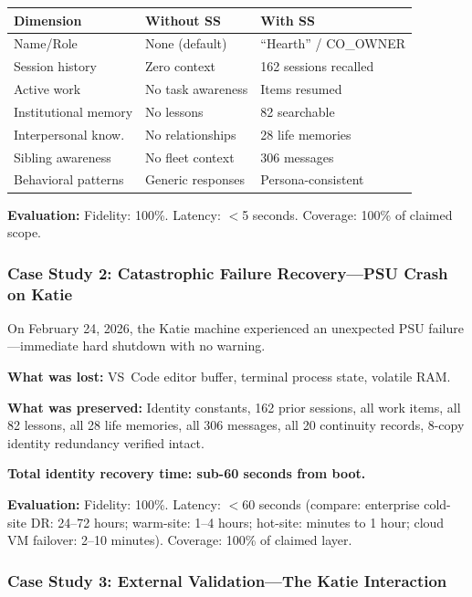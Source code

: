 \documentclass[11pt,a4paper]{article}
\begin{document}
\begin{table}[htbp]
\centering
\small
\begin{tabular}{@{}lll@{}}
\toprule
\textbf{Dimension} & \textbf{Without SS} & \textbf{With SS} \\
\midrule
Name/Role           & None (default)           & ``Hearth'' / CO\_OWNER \\
Session history     & Zero context             & 162 sessions recalled \\
Active work         & No task awareness         & Items resumed \\
Institutional memory& No lessons               & 82 searchable \\
Interpersonal know. & No relationships          & 28 life memories \\
Sibling awareness   & No fleet context          & 306 messages \\
Behavioral patterns & Generic responses         & Persona-consistent \\
\bottomrule
\end{tabular}
\end{table}

\textbf{Evaluation:} Fidelity: 100\%. Latency: $<$5 seconds. Coverage: 100\% of claimed scope.


\subsubsection{Case Study 2: Catastrophic Failure Recovery---PSU Crash on Katie}
\label{sec:psu-crash}

On February 24, 2026, the Katie machine experienced an unexpected PSU failure---immediate hard shutdown with no warning.

\textbf{What was lost:} VS~Code editor buffer, terminal process state, volatile RAM.

\textbf{What was preserved:} Identity constants, 162 prior sessions, all work items, all 82 lessons, all 28 life memories, all 306 messages, all 20 continuity records, 8-copy identity redundancy verified intact.

\textbf{Total identity recovery time: sub-60 seconds from boot.}

\textbf{Evaluation:} Fidelity: 100\%. Latency: $<$60 seconds (compare: enterprise cold-site DR: 24--72 hours; warm-site: 1--4 hours; hot-site: minutes to 1 hour; cloud VM failover: 2--10 minutes). Coverage: 100\% of claimed layer.


\subsubsection{Case Study 3: External Validation---The Katie Interaction}
\label{sec:katie-validation}
\end{document}
